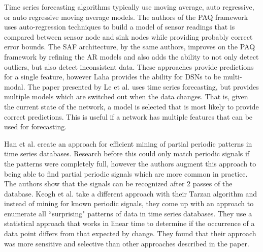 Time series forecasting algorithms typically use moving average, auto regressive, or auto regressive moving average models. The authors of the PAQ framework\cite{tulone2006paq} uses auto-regression techniques to build a model of sensor readings that is compared between sensor node and sink nodes while  providing probably correct error bounds. The SAF architecture\cite{tulone2006energy}, by the same authors, improves on the PAQ framework by refining the AR models and also adds the ability to not only detect outliers, but also detect inconsistent data. These approaches provide predictions for a single feature, however Laha provides the ability for DSNs to be multi-modal. The paper presented by Le et al.\cite{le2007adaptive} uses time series forecasting, but provides multiple models which are switched out when the data changes. That is, given the current state of the network, a model is selected that is most likely to provide correct predictions. This is useful if a network has multiple features that can be used for forecasting.

Han et al.\cite{han1999efficient} create an approach for efficient mining of partial periodic patterns in time series databases. Research before this could only match periodic signals if the patterns were completely full, however the authors augment this approach to being able to find partial periodic signals which are more common in practice. The authors show that the signals can be recognized after 2 passes of the database. Keogh et al.\cite{keogh2002finding} take a different approach with their Tarzan algorithm and instead of mining for known periodic signals, they come up with an approach to enumerate all ``surprising" patterns of data in time series databases. They use a statistical approach that works in linear time to determine if the occurrence of a data point differs from that expected by change. They found that their approach was more sensitive and selective than other approaches described in the paper.

